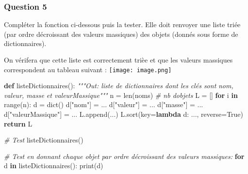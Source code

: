 \documentclass[
  paper=a4,
  ,captions=tableheading
]{scrartcl}
\newenvironment{Shaded}{}{}
\newcommand{\BuiltInTok}[1]{\textcolor[rgb]{0.00,0.50,0.00}{#1}}
\newcommand{\CommentTok}[1]{\textcolor[rgb]{0.38,0.63,0.69}{\textit{#1}}}
\newcommand{\ControlFlowTok}[1]{\textcolor[rgb]{0.00,0.44,0.13}{\textbf{#1}}}
\newcommand{\KeywordTok}[1]{\textcolor[rgb]{0.00,0.44,0.13}{\textbf{#1}}}
\newcommand{\NormalTok}[1]{#1}
\newcommand{\OperatorTok}[1]{\textcolor[rgb]{0.40,0.40,0.40}{#1}}
\newcommand{\StringTok}[1]{\textcolor[rgb]{0.25,0.44,0.63}{#1}}
\newcommand{\VariableTok}[1]{\textcolor[rgb]{0.10,0.09,0.49}{#1}}
\begin{document}
\hypertarget{question-5}{%
\subsubsection{Question 5}\label{question-5}}

Compléter la fonction ci-dessous puis la tester. Elle doit renvoyer une
liste triée (par ordre décroissant des valeurs massiques) des objets
(donnés sous forme de dictionnaires).

On vérifera que cette liste est correctement trièe et que les valeurs
massiques correspondent au tableau suivant : \texttt{[image: image.png]}

\begin{Shaded}
\begin{Highlighting}[]
\KeywordTok{def}\NormalTok{ listeDictionnaires():}
    \CommentTok{"""Out: liste de dictionnaires dont les clés sont}
\CommentTok{    nom, valeur, masse et valeurMassique"""}
\NormalTok{    n }\OperatorTok{=} \BuiltInTok{len}\NormalTok{(noms)  }\CommentTok{\# nb d\textquotesingle{}objets}
\NormalTok{    L }\OperatorTok{=}\NormalTok{ []}
    \ControlFlowTok{for}\NormalTok{ i }\KeywordTok{in} \BuiltInTok{range}\NormalTok{(n):}
\NormalTok{        d }\OperatorTok{=} \BuiltInTok{dict}\NormalTok{()}
\NormalTok{        d[}\StringTok{"nom"}\NormalTok{] }\OperatorTok{=}\NormalTok{ ...}
\NormalTok{        d[}\StringTok{"valeur"}\NormalTok{] }\OperatorTok{=}\NormalTok{ ...}
\NormalTok{        d[}\StringTok{"masse"}\NormalTok{] }\OperatorTok{=}\NormalTok{ ...}
\NormalTok{        d[}\StringTok{"valeurMassique"}\NormalTok{] }\OperatorTok{=}\NormalTok{ ...}
\NormalTok{        L.append(...)}
\NormalTok{    L.sort(key}\OperatorTok{=}\KeywordTok{lambda}\NormalTok{ d: ..., reverse}\OperatorTok{=}\VariableTok{True}\NormalTok{)}
    \ControlFlowTok{return}\NormalTok{ L}
\end{Highlighting}
\end{Shaded}

\begin{Shaded}
\begin{Highlighting}[]
\CommentTok{\# Test}
\NormalTok{listeDictionnaires()}
\end{Highlighting}
\end{Shaded}

\begin{Shaded}
\begin{Highlighting}[]
\CommentTok{\# Test en donnant chaque objet par ordre décroissant des valeurs massiques:}
\ControlFlowTok{for}\NormalTok{ d }\KeywordTok{in}\NormalTok{ listeDictionnaires():}
    \BuiltInTok{print}\NormalTok{(d)}
\end{Highlighting}
\end{Shaded}
\end{document}
